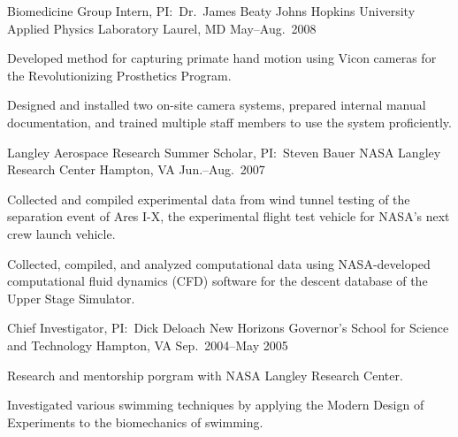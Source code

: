 \begin{cventries}
  \cventry%
    {Biomedicine Group Intern, PI:\ Dr.~James Beaty}
    {Johns Hopkins University Applied Physics Laboratory}
    {Laurel, MD}
    {May--Aug.\ 2008}
    {
      \begin{cvitems}
        \item{Developed method for capturing primate hand motion using Vicon cameras for the Revolutionizing Prosthetics Program.}
        \item{Designed and installed two on-site camera systems, prepared internal manual documentation, and trained multiple staff members to use the system proficiently.}
      \end{cvitems}
    }

 \cventry%
   {Langley Aerospace Research Summer Scholar, PI:\ Steven Bauer}
   {NASA Langley Research Center}
   {Hampton, VA}
   {Jun.--Aug.\ 2007}
   {
     \begin{cvitems}
       \item{Collected and compiled experimental data from wind tunnel testing of the separation event of Ares I-X, the experimental flight test vehicle for NASA's next crew launch vehicle.}
       \item{Collected, compiled, and analyzed computational data using NASA-developed computational fluid dynamics (CFD) software for the descent database of the Upper Stage Simulator.}
     \end{cvitems}
   }

 \cventry%
   {Chief Investigator, PI:\ Dick Deloach}
   {New Horizons Governor's School for Science and Technology}
   {Hampton, VA}
   {Sep.\ 2004--May 2005}
   {
     \begin{cvitems}
       \item{Research and mentorship porgram with NASA Langley Research Center.}
       \item{Investigated various swimming techniques by applying the Modern Design of Experiments to the biomechanics of swimming.}
     \end{cvitems}
   }
\end{cventries}
